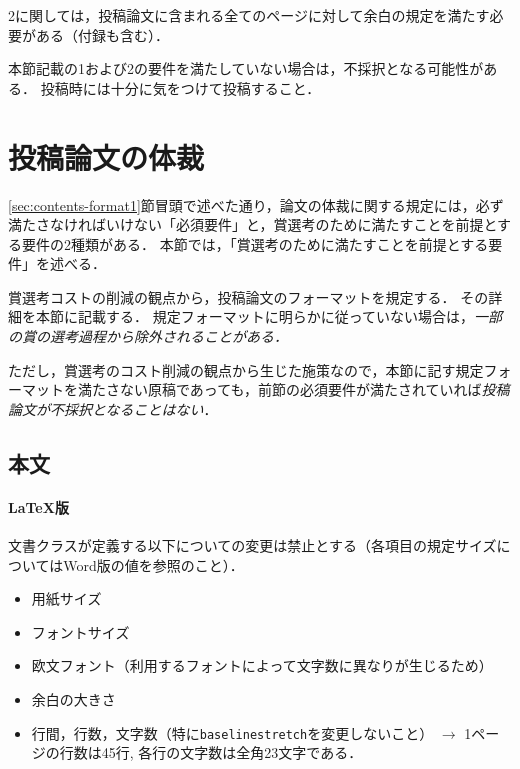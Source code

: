 \documentclass[
  platex, dvipdfmx,  %
]{nlp2024}
\newcommand{\code}[1]{\texttt{#1}}
\begin{document}
2に関しては，投稿論文に含まれる全てのページに対して余白の規定を満たす必要がある（付録も含む）．

本節記載の1および2の要件を満たしていない場合は，不採択となる可能性がある．
投稿時には十分に気をつけて投稿すること．



\section{投稿論文の体裁}
\label{sec:contents-format2}
\ref{sec:contents-format1}節冒頭で述べた通り，論文の体裁に関する規定には，必ず満たさなければいけない「必須要件」と，賞選考のために満たすことを前提とする要件の2種類がある．
本節では，「賞選考のために満たすことを前提とする要件」を述べる．

賞選考コストの削減の観点から，投稿論文のフォーマットを規定する．
その詳細を本節に記載する．
規定フォーマットに明らかに従っていない場合は，\emph{一部の賞の選考過程から除外されることがある．}

ただし，賞選考のコスト削減の観点から生じた施策なので，本節に記す規定フォーマットを満たさない原稿であっても，前節の必須要件が満たされていれば\emph{投稿論文が不採択となることはない}．



\subsection{本文}

\paragraph{LaTeX版}
文書クラスが定義する以下についての変更は禁止とする（各項目の規定サイズについてはWord版の値を参照のこと）．
\begin{itemize}
\item 用紙サイズ
\item フォントサイズ
\item 欧文フォント（利用するフォントによって文字数に異なりが生じるため）
\item 余白の大きさ
\item 行間，行数，文字数（特に\code{baselinestretch}を変更しないこと） $\rightarrow$ 1ページの行数は45行, 各行の文字数は全角23文字である．
\end{itemize}
\end{document}
